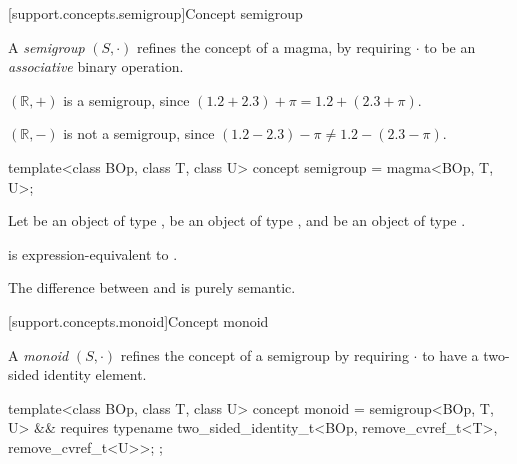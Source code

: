 
[support.concepts.semigroup]{Concept semigroup}

\pnum
A \textit{semigroup} $(S, \cdot)$ refines the concept of a magma, by requiring $\cdot$ to be an
\textit{associative} binary operation.

\pnum
\begin{example}
   $(\mathbb{R}, +)$ is a semigroup, since $(1.2 + 2.3) + \pi = 1.2 + (2.3 + \pi)$.
\end{example}

\pnum
\begin{example}
   $(\mathbb{R}, -)$ is not a semigroup, since $(1.2 - 2.3) - \pi \neq 1.2 - (2.3 - \pi)$.
\end{example}

\begin{itemdecl}
  template<class BOp, class T, class U>
  concept semigroup = magma<BOp, T, U>;
\end{itemdecl}
\begin{itemdescr}
   \pnum
   Let  be an object of type ,  be an object of type , and
    be an object of type .

   \pnum
    is expression-equivalent to
   .

   \pnum
   \begin{note}
      The difference between  and  is purely semantic.
   \end{note}
\end{itemdescr}

[support.concepts.monoid]{Concept monoid}

\pnum
A \textit{monoid} $(S, \cdot)$ refines the concept of a semigroup by requiring $\cdot$ to have a
two-sided identity element.

\begin{itemdecl}
  template<class BOp, class T, class U>
  concept monoid = semigroup<BOp, T, U> && requires {
    typename two_sided_identity_t<BOp, remove_cvref_t<T>, remove_cvref_t<U>>;
  };
\end{itemdecl}

